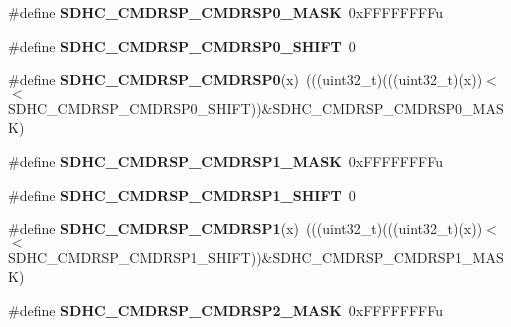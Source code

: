 \begin{DoxyCompactItemize}
\item 
\#define {\bfseries S\+D\+H\+C\+\_\+\+C\+M\+D\+R\+S\+P\+\_\+\+C\+M\+D\+R\+S\+P0\+\_\+\+M\+A\+SK}~0x\+F\+F\+F\+F\+F\+F\+F\+Fu\hypertarget{group__SDHC__Register__Masks_ga0e18ea51c0f8c567b8c7f0c8daed3a3f}{}\label{group__SDHC__Register__Masks_ga0e18ea51c0f8c567b8c7f0c8daed3a3f}

\item 
\#define {\bfseries S\+D\+H\+C\+\_\+\+C\+M\+D\+R\+S\+P\+\_\+\+C\+M\+D\+R\+S\+P0\+\_\+\+S\+H\+I\+FT}~0\hypertarget{group__SDHC__Register__Masks_gaea81f8c10607500c0232c031cb1c736b}{}\label{group__SDHC__Register__Masks_gaea81f8c10607500c0232c031cb1c736b}

\item 
\#define {\bfseries S\+D\+H\+C\+\_\+\+C\+M\+D\+R\+S\+P\+\_\+\+C\+M\+D\+R\+S\+P0}(x)~(((uint32\+\_\+t)(((uint32\+\_\+t)(x))$<$$<$S\+D\+H\+C\+\_\+\+C\+M\+D\+R\+S\+P\+\_\+\+C\+M\+D\+R\+S\+P0\+\_\+\+S\+H\+I\+FT))\&S\+D\+H\+C\+\_\+\+C\+M\+D\+R\+S\+P\+\_\+\+C\+M\+D\+R\+S\+P0\+\_\+\+M\+A\+SK)\hypertarget{group__SDHC__Register__Masks_ga9e228a5f41a153a74c6c5e567b4ec1ef}{}\label{group__SDHC__Register__Masks_ga9e228a5f41a153a74c6c5e567b4ec1ef}

\item 
\#define {\bfseries S\+D\+H\+C\+\_\+\+C\+M\+D\+R\+S\+P\+\_\+\+C\+M\+D\+R\+S\+P1\+\_\+\+M\+A\+SK}~0x\+F\+F\+F\+F\+F\+F\+F\+Fu\hypertarget{group__SDHC__Register__Masks_gaf2029a539168eda397f19588b928af0f}{}\label{group__SDHC__Register__Masks_gaf2029a539168eda397f19588b928af0f}

\item 
\#define {\bfseries S\+D\+H\+C\+\_\+\+C\+M\+D\+R\+S\+P\+\_\+\+C\+M\+D\+R\+S\+P1\+\_\+\+S\+H\+I\+FT}~0\hypertarget{group__SDHC__Register__Masks_ga5954455de5b963fe88033ee57abc8682}{}\label{group__SDHC__Register__Masks_ga5954455de5b963fe88033ee57abc8682}

\item 
\#define {\bfseries S\+D\+H\+C\+\_\+\+C\+M\+D\+R\+S\+P\+\_\+\+C\+M\+D\+R\+S\+P1}(x)~(((uint32\+\_\+t)(((uint32\+\_\+t)(x))$<$$<$S\+D\+H\+C\+\_\+\+C\+M\+D\+R\+S\+P\+\_\+\+C\+M\+D\+R\+S\+P1\+\_\+\+S\+H\+I\+FT))\&S\+D\+H\+C\+\_\+\+C\+M\+D\+R\+S\+P\+\_\+\+C\+M\+D\+R\+S\+P1\+\_\+\+M\+A\+SK)\hypertarget{group__SDHC__Register__Masks_gaf0fd5fa34fba78caff6561aba2c97e03}{}\label{group__SDHC__Register__Masks_gaf0fd5fa34fba78caff6561aba2c97e03}

\item 
\#define {\bfseries S\+D\+H\+C\+\_\+\+C\+M\+D\+R\+S\+P\+\_\+\+C\+M\+D\+R\+S\+P2\+\_\+\+M\+A\+SK}~0x\+F\+F\+F\+F\+F\+F\+F\+Fu\hypertarget{group__SDHC__Register__Masks_ga60782d85358658786d1a76fe99379622}{}\label{group__SDHC__Register__Masks_ga60782d85358658786d1a76fe99379622}


\end{DoxyCompactItemize}
